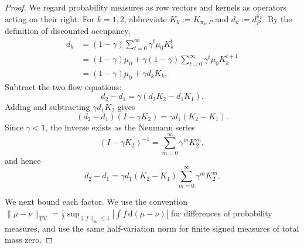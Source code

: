 \documentclass[12pt]{article}
\theoremstyle{remark}\newtheorem{remark}[theorem]{Remark}\theoremstyle{plain}
\begin{document}
\begin{proof}
    We regard probability measures as row vectors and kernels as
    operators acting on their right.  For $k=1,2$, abbreviate
    $K_k:=K_{\pi_k,P}$ and $d_k:=d_P^{\pi_k}$.  By the definition of
    discounted occupancy,
    \[
        \begin{aligned}
        d_k
        &=(1-\gamma)\sum_{t=0}^{\infty}
          \gamma^t\mu_0K_k^t\\
        &=(1-\gamma)\mu_0+
          \gamma(1-\gamma)\sum_{t=0}^{\infty}
          \gamma^t\mu_0K_k^{t+1}\\
        &=(1-\gamma)\mu_0+\gamma d_kK_k.
        \end{aligned}
    \]
    Subtract the two flow equations:
    \[
        d_2-d_1
        =\gamma(d_2K_2-d_1K_1).
    \]
    Adding and subtracting $\gamma d_1K_2$ gives
    \[
        (d_2-d_1)(I-\gamma K_2)
        =\gamma d_1(K_2-K_1).
    \]
    Since $\gamma<1$, the inverse exists as the Neumann series
    \[
        (I-\gamma K_2)^{-1}
        =\sum_{m=0}^{\infty}\gamma^mK_2^m,
    \]
    and hence
    \begin{equation}\label{eq:occupancy_resolvent_difference}
        d_2-d_1
        =\gamma d_1(K_2-K_1)
        \sum_{m=0}^{\infty}\gamma^mK_2^m.
    \end{equation}

    We next bound each factor.  We use the convention
    $\|\mu-\nu\|_{\mathrm{TV}}
      =\frac12\sup_{\|f\|_\infty\leq1}
      |\int f\,\mathrm d(\mu-\nu)|$ for differences of probability
      measures, and use the same half-variation norm for finite
      signed measures of total mass zero.



\end{proof}
\end{document}

